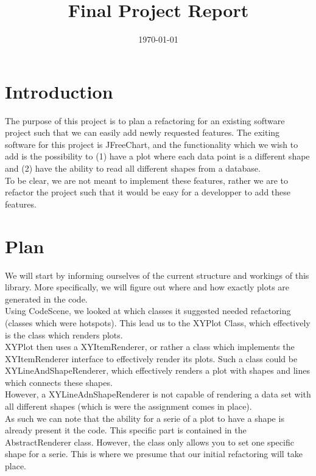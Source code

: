 \documentclass{article}
\title{\textmd{\textbf{Final Project Report}}\\\normalsize\vspace{0.1in}\Large{\projectnaam}}
\author{\student}\date{\today}
\begin{document}
\maketitle
\newpage

\section{Introduction}

The purpose of this project is to plan a refactoring for an existing software project such that we can easily add newly requested features.
The exiting software for this project is JFreeChart, and the functionality which we wish to add is the possibility to (1) have a plot where each data point is a different shape and (2) have the ability to read all different shapes from a database.\\

To be clear, we are not meant to implement these features, rather we are to refactor the project such that it would be easy for a developper to add these features.

\section{Plan}

We will start by informing ourselves of the current structure and workings of this library. More specifically, we will figure out where and how exactly plots are generated in the code.\\

Using CodeScene, we looked at which classes it suggested needed refactoring (classes which were hotspots). This lead us to the XYPlot Class, which effectively is the class which renders plots.\\

XYPlot then uses a XYItemRenderer, or rather a class which implements the XYItemRenderer interface to effectively render its plots. Such a class could be XYLineAndShapeRenderer, which effectively renders a plot with shapes and lines which connects these shapes.\\

However, a XYLineAdnShapeRenderer is not capable of rendering a data set with all different shapes (which is were the assignment comes in place).\\

As such we can note that the ability for a serie of a plot to have a shape is already present it the code. This specific part is contained in the AbstractRenderer class. However, the class only allows you to set one specific shape for a serie. This is where we presume that our initial refactoring will take place.\\
\end{document}
